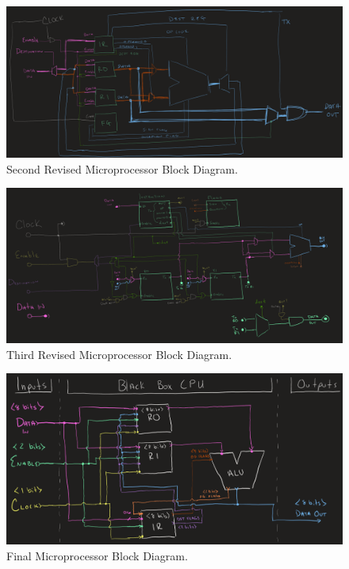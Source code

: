 \documentclass{article}
\begin{document}
\pagebreak

\begin{figure}[ht!]
    \centering
    \includegraphics[width=\textwidth]{./_img/Block_Diagram_v2.PNG}
    \caption{Second Revised Microprocessor Block Diagram.}
    \label{fig:block2}
\end{figure}

\begin{figure}[ht!]
    \centering
    \includegraphics[width=\textwidth]{./_img/Block_Diagram_v3.PNG}
    \caption{Third Revised Microprocessor Block Diagram.}
    \label{fig:block3}
\end{figure}

\pagebreak

\begin{figure}[ht!]
    \centering
    \includegraphics[width=\textwidth]{./_img/Block_Diagram.PNG}
    \caption{Final Microprocessor Block Diagram.}
    \label{fig:block4}
\end{figure}
\end{document}
